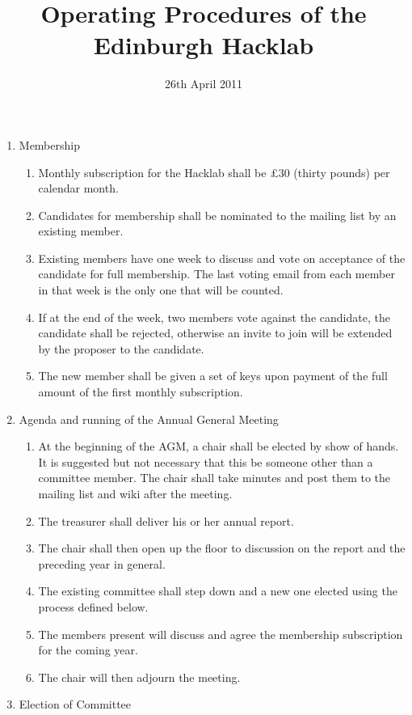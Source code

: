 \documentclass{article}
\title{Operating Procedures of the Edinburgh Hacklab}
\date{26th April 2011}
\begin{document}
\maketitle
\begin{enumerate}
\item Membership
  \begin{enumerate}
  \item Monthly subscription for the Hacklab shall be \pounds 30
    (thirty pounds) per calendar month.
  \item Candidates for membership shall be nominated to the mailing
    list by an existing member.
  \item Existing members have one week to discuss and vote on
    acceptance of the candidate for full membership. The last voting
    email from each member in that week is the only one that will be
    counted.
  \item If at the end of the week, two members vote against the
    candidate, the candidate shall be rejected, otherwise an invite to
    join will be extended by the proposer to the candidate.
  \item The new member shall be given a set of keys upon payment of
    the full amount of the first monthly subscription.
  \end{enumerate} %
\item Agenda and running of the Annual General Meeting
  \begin{enumerate}
  \item At the beginning of the AGM, a chair shall be elected by show
    of hands. It is suggested but not necessary that this be someone
    other than a committee member. The chair shall take minutes and
    post them to the mailing list and wiki after the meeting.
  \item The treasurer shall deliver his or her annual report.
  \item The chair shall then open up the floor to discussion on the
    report and the preceding year in general.
  \item The existing committee shall step down and a new one elected
    using the process defined below.
  \item The members present will discuss and agree the membership
    subscription for the coming year.
  \item The chair will then adjourn the meeting.
  \end{enumerate}
\item Election of Committee
  \begin{enumerate}

\end{enumerate}
\end{enumerate}
\end{document}
